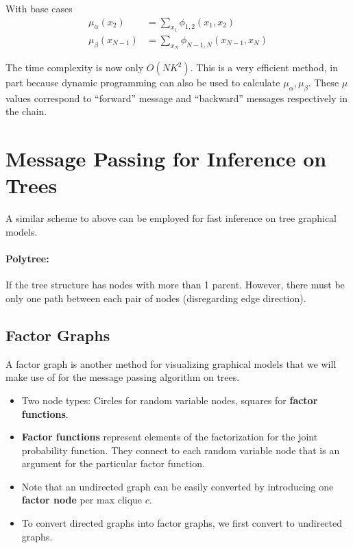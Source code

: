 \documentclass[a4paper,12pt]{report}
\begin{document}
With base cases
\begin{equation}
\begin{split}
\mu_{\alpha}(x_2) &= \sum_{x_1}^{} \phi_{1,2}(x_1, x_2) \\
\mu_\beta(x_{N-1}) &= \sum_{x_N}^{} \phi_{N-1, N}(x_{N-1}, x_N)
\end{split}
\end{equation}


The time complexity is now only $O(NK^2)$. This is a very efficient method, in part because dynamic programming can also be used to calculate $\mu_\alpha, \mu_\beta$. These $\mu$ values correspond to ``forward'' message and ``backward'' messages respectively in the chain.


\section{Message Passing for Inference on Trees}

A similar scheme to above can be employed for fast inference on tree graphical models. 

\paragraph{Polytree: } If the tree structure has nodes with more than 1 parent. However, there must be only one path between each pair of nodes (disregarding edge direction). 

\subsection{Factor Graphs}

A factor graph is another method for visualizing graphical models that we will make use of for the message passing algorithm on trees. 
\begin{itemize} 
\item Two node types: Circles for random variable nodes, squares for \textbf{factor functions}.
\item \textbf{Factor functions} represent elements of the factorization for the joint probability function. They connect to each random variable node that is an argument for the particular factor function.
\item Note that an undirected graph can be easily converted by introducing one \textbf{factor node} per max clique $c$. 
\item To convert directed graphs into factor graphs, we first convert to undirected graphs. 
\end{itemize}
\end{document}

